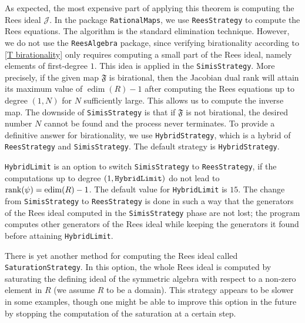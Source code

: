 \documentclass[11pt]{amsart}%
\numberwithin{equation}{theorem}
\renewcommand{\:}{\colon}
\DeclareMathOperator{\edim}{edim}
\theoremstyle{theorem}
\begin{document}
As expected, the most expensive part of applying this theorem is computing the Rees ideal ${\mathcal J}$. In the package {\tt RationalMaps}, we use {\tt ReesStrategy} to compute the Rees equations. The algorithm is the standard elimination technique. However, we do not use the {\tt ReesAlgebra} package, since verifying birationality according to \autoref{T birationality} only requires  computing a small part of the Rees ideal, namely elements of first-degree $1$. This idea is applied in the {\tt SimisStrategy}. More precisely, if the given map $\mathfrak{F}$ is birational, then the Jacobian dual rank will attain its maximum value of $\edim(R)-1$ after computing the Rees equations up to  degree $(1,N)$ for $N$ sufficiently large. This allows us to compute the inverse map.  The downside of {\tt SimisStrategy} is that if $\mathfrak{F}$ is not birational,  the desired number $N$ cannot be found and the process never terminates. To provide a definitive answer for birationality,  we use {\tt HybridStrategy}, which is a hybrid of {\tt ReesStrategy} and {\tt SimisStrategy}.  The default strategy is {\tt HybridStrategy}.

{\tt HybridLimit} is an option to switch   {\tt SimisStrategy} to  {\tt{ReesStrategy}}, if the computations up to degree $(1, \tt{HybridLimit})$ do not lead to   ${\rm rank}(\psi)=\edim(R)-1$.
The default value for {\tt HybridLimit} is $15$. The change from  {\tt SimisStrategy} to  {\tt ReesStrategy} is done in such a way that the generators of the Rees ideal computed in the { \tt SimisStrategy} phase are not lost; the program computes other generators of the Rees ideal while keeping the generators it found before attaining {\tt HybridLimit}.

There is yet another method for computing the Rees ideal called {\tt SaturationStrategy}. In this option, the whole Rees ideal is computed by saturating the defining ideal of the symmetric algebra with respect to a non-zero element in $R$ (we assume $R$ to be a domain). This strategy appears to be slower in some examples, though one might be able to  improve this option in the future by stopping the computation of the saturation at a certain step.
\end{document}
